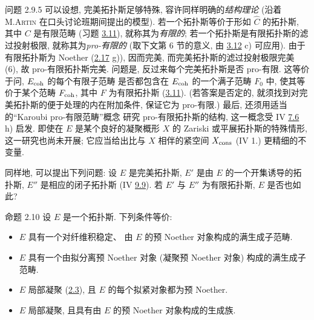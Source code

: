 \begin{enonce*}[remark]{问题 2.9.5}
可以设想, 完美拓扑斯足够特殊,
容许同样明确的\emph{结构理论}
(沿着 M.\textsc{Artin} 在口头讨论班期间提出的模型).
若一个拓扑斯等价于形如 $\widehat{C}$ 的拓扑斯,
其中 $C$ 是有限范畴 (\cf 习题 \hyperref[VI.exer3.11]{3.11}),
就称其为\emph{有限的};
若一个拓扑斯是有限拓扑斯的滤过投射极限,
就称其为\emph{pro-有限的}
(取下文第 6 节的意义, 由 \hyperref[VI.exer3.12]{3.12} c) 可应用).
由于有限拓扑斯为 Noether (\hyperref[VI.exer2.17]{2.17} g)),
因而完美, 而完美拓扑斯的滤过投射极限完美 (6),
故 pro-有限拓扑斯完美.
问题是, 反过来每个完美拓扑斯是否 pro-有限.
这等价于问, $E_{\mathrm{coh}}$ 的每个有限子范畴
是否都包含在 $E_{\mathrm{coh}}$ 的一个满子范畴 $F_0$ 中,
使其等价于某个范畴 $F_{\mathrm{coh}}$,
其中 $F$ 为有限拓扑斯 (\cf \hyperref[VI.exer3.11]{3.11}).
(若答案是否定的,
就须找到对完美拓扑斯的便于处理的内在附加条件,
保证它为 pro-有限.)
最后, 还须用适当的“Karoubi pro-有限范畴”概念
研究 pro-有限拓扑斯的结构,
这一概念受 IV \hyperref[IV.exer7.6]{7.6} h) 启发.
即使在 $E$ 是某个良好的凝聚概形 $X$ 的 Zariski 或平展拓扑斯的特殊情形,
这一研究\pageoriginale{}也尚未开展;
它应当给出比与 $X$ 相伴的紧空间 $X_{\operatorname{cons}}$
(\EGA IV 1.) 更精细的不变量.

同样地, 可以提出下列问题:
设 $E$ 是完美拓扑斯,
$E'$ 是由 $E$ 的一个开集诱导的拓扑斯,
$E''$ 是相应的闭子拓扑斯
(IV \hyperref[IV.subsubsec9.3.5]{9.9}).
若 $E'$ 与 $E''$ 为有限拓扑斯, $E$ 是否也如此?
\end{enonce*}



\begin{enonce*}{命题 2.10}
设 $E$ 是一个拓扑斯. 下列条件等价:
\begin{itemize}
\item[(i)] $E$ 具有一个对纤维积稳定、
由 $E$ 的预 Noether 对象构成的满生成子范畴.

\item[(ii)] $E$ 具有一个由拟分离预 Noether 对象
(\ie 凝聚预 Noether 对象) 构成的满生成子范畴.

\item[(iii)] $E$ 局部凝聚 (\hyperref[VI.def2.3]{2.3}),
且 $E$ 的每个拟紧对象都为预 Noether.

\item[(iii bis)] $E$ 局部凝聚,
且具有由 $E$ 的预 Noether 对象构成的生成族.
\end{itemize}
\end{enonce*}

